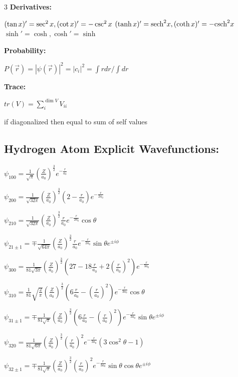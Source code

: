 \documentclass[10pt,a4paper]{article}
\begin{document}
\begin{multicols*}{3}
\textbf{Derivatives:} 

$(\tan x)' = \sec^2 x, (\cot x)' = -\csc^2 x \\$
$(\tanh x)' = \text{sech}^2 x, (\coth x)' = -\text{csch}^2 x \\$
$\sinh' = \cosh, \cosh' = \sinh$

\textbf{Probability:} 

$P(\vec{r}) = |\psi(\vec{r})|^2 = |c_i|^2 = \int r dr / \int dr $

\textbf{Trace:}

$tr(V)=\sum_i^{\dim V}V_{ii}$

if diagonalized then equal to sum of self values

\subsection*{Hydrogen Atom Explicit Wavefunctions:}

$\psi_{100} = \frac{1}{\sqrt{\pi}} \left(\frac{Z}{a_0}\right)^{\frac{3}{2}} e^{-\frac{r}{a_0}}$

$\psi_{200} = \frac{1}{\sqrt{32\pi}} \left(\frac{Z}{a_0}\right)^{\frac{3}{2}} \left(2 - \frac{r}{a_0}\right) e^{-\frac{r}{2a_0}}$

$\psi_{210} = \frac{1}{\sqrt{32\pi}} \left(\frac{Z}{a_0}\right)^{\frac{3}{2}} \frac{r}{a_0} e^{-\frac{r}{2a_0}} \cos\theta$

$\psi_{21\pm1} = \mp \frac{1}{\sqrt{64\pi}} \left(\frac{Z}{a_0}\right)^{\frac{3}{2}} \frac{r}{a_0} e^{-\frac{r}{2a_0}} \sin\theta e^{\pm i\phi}$

$\psi_{300} = \frac{1}{81\sqrt{3\pi}} \left(\frac{Z}{a_0}\right)^{\frac{3}{2}} \left(27 - 18\frac{r}{a_0} + 2\left(\frac{r}{a_0}\right)^2\right) e^{-\frac{r}{3a_0}}$

$\psi_{310} = \frac{1}{81}\sqrt{\frac{2}{\pi}} \left(\frac{Z}{a_0}\right)^{\frac{3}{2}} \left(6\frac{r}{a_0} - \left(\frac{r}{a_0}\right)^2\right) e^{-\frac{r}{3a_0}} \cos\theta$

$\psi_{31\pm1} = \mp \frac{1}{81\sqrt{\pi}} \left(\frac{Z}{a_0}\right)^{\frac{3}{2}} \left(6\frac{r}{a_0} - \left(\frac{r}{a_0}\right)^2\right) e^{-\frac{r}{3a_0}} \sin\theta e^{\pm i\phi}$

$\psi_{320} = \frac{1}{81\sqrt{6\pi}} \left(\frac{Z}{a_0}\right)^{\frac{3}{2}} \left(\frac{r}{a_0}\right)^2 e^{-\frac{r}{3a_0}} (3\cos^2\theta-1)$

$\psi_{32\pm1} = \mp \frac{1}{81\sqrt{\pi}} \left(\frac{Z}{a_0}\right)^{\frac{3}{2}} \left(\frac{r}{a_0}\right)^2 e^{-\frac{r}{3a_0}} \sin\theta \cos\theta e^{\pm i\phi}$


\end{multicols*}
\end{document}
